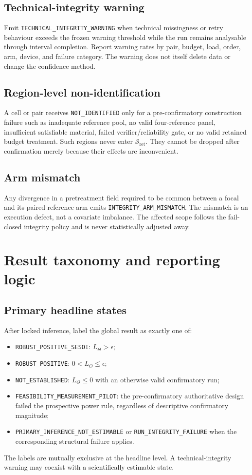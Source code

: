 \documentclass[11pt,a4paper]{article}
\newcommand{\NOTID}{\texttt{NOT\_IDENTIFIED}}
\newcommand{\INFERNE}{\texttt{PRIMARY\_INFERENCE\_NOT\_\allowbreak ESTIMABLE}}
\newcommand{\TECHWARN}{\nolinkurl{TECHNICAL_INTEGRITY_WARNING}}
\newcommand{\ARMMISMATCH}{\texttt{INTEGRITY\_ARM\_\allowbreak MISMATCH}}
\newcommand{\RUNFAIL}{\nolinkurl{RUN_INTEGRITY_FAILURE}}
\newcommand{\Sc}{\mathcal S_{\mathrm{ret}}}
\begin{document}
\subsection{Technical-integrity warning}
Emit \TECHWARN{} when technical missingness or retry behaviour exceeds the frozen warning threshold while the run remains analysable through interval completion. Report warning rates by pair, budget, load, order, arm, device, and failure category. The warning does not itself delete data or change the confidence method.

\subsection{Region-level non-identification}
A cell or pair receives \NOTID{} only for a pre-confirmatory construction failure such as inadequate reference pool, no valid four-reference panel, insufficient satisfiable material, failed verifier/reliability gate, or no valid retained budget treatment. Such regions never enter $\Sc$. They cannot be dropped after confirmation merely because their effects are inconvenient.

\subsection{Arm mismatch}
Any divergence in a pretreatment field required to be common between a focal and its paired reference arm emits \ARMMISMATCH{}. The mismatch is an execution defect, not a covariate imbalance. The affected scope follows the fail-closed integrity policy and is never statistically adjusted away.

\section{Result taxonomy and reporting logic}

\subsection{Primary headline states}
After locked inference, label the global result as exactly one of:
\begin{itemize}
\item \texttt{ROBUST\_POSITIVE\_SESOI}: $L_\Theta>\epsilon$;
\item \texttt{ROBUST\_POSITIVE}: $0<L_\Theta\le\epsilon$;
\item \texttt{NOT\_ESTABLISHED}: $L_\Theta\le0$ with an otherwise valid confirmatory run;
\item \texttt{FEASIBILITY\_MEASUREMENT\_PILOT}: the pre-confirmatory authoritative design failed the prospective power rule, regardless of descriptive confirmatory magnitude;
\item \INFERNE{} or \RUNFAIL{} when the corresponding structural failure applies.
\end{itemize}
The labels are mutually exclusive at the headline level. A technical-integrity warning may coexist with a scientifically estimable state.
\end{document}
